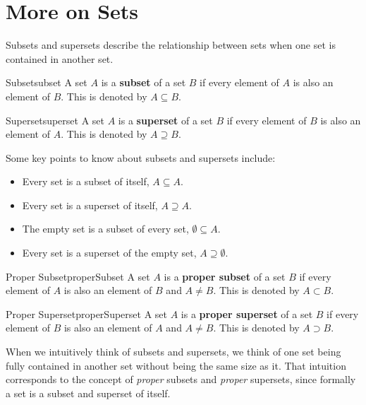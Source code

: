 \section{More on Sets}
Subsets and supersets describe the relationship between sets when one set is contained in
another set.

\begin{definition}{Subset}{subset}
  A set \( A \) is a \textbf{subset} of a set \( B \) if every element of
  \( A \) is also an element of \( B \).  This is denoted by \( A \subseteq B \).
\end{definition}

\begin{definition}
    {Superset}{superset}
    A set \( A \) is a \textbf{superset} of a set \( B \) if every element of
    \( B \) is also an element of \( A \). This is denoted by \( A \supseteq B \).
\end{definition}

Some key points to know about subsets and supersets include:
\begin{itemize}
  \item Every set is a subset of itself, \( A \subseteq A \).
  \item Every set is a superset of itself, \( A \supseteq A \).
  \item The empty set is a subset of every set, \( \emptyset \subseteq A \).
  \item Every set is a superset of the empty set, \( A \supseteq \emptyset \).
\end{itemize}


\begin{definition}{Proper Subset}{properSubset}
  A set \( A \) is a \textbf{proper subset} of a set \( B \) if every element of
  \( A \) is also an element of \( B \) and \( A \neq B \). This is denoted by
  \( A \subset B \).
\end{definition}

\begin{definition}
    {Proper Superset}{properSuperset}
    A set \( A \) is a \textbf{proper superset} of a set \( B \) if every element of
    \( B \) is also an element of \( A \) and \( A \neq B \). This is denoted by
    \( A \supset B \).
\end{definition}

When we intuitively think of subsets and supersets, we think of one set being
fully contained in another set without being the same size as it. That intuition
corresponds to the concept of \emph{proper} subsets and \emph{proper} supersets,
since formally a set is a subset and superset of itself.

